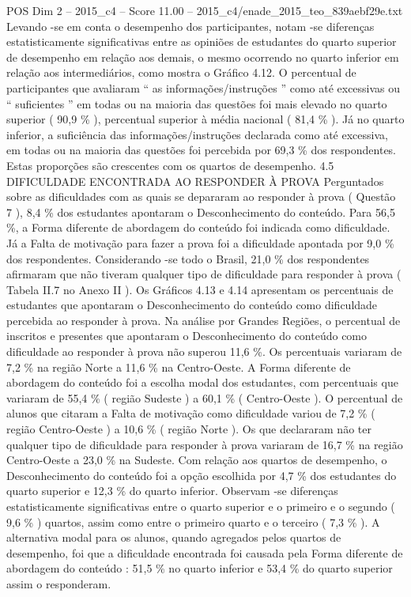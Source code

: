 \begin{textsample}{POS Dim 2 – 2015\_c4 – Score 11.00 – 2015\_c4/enade\_2015\_teo\_839aebf29e.txt}
Levando -se em conta o desempenho dos participantes, notam -se diferenças estatisticamente significativas entre as opiniões de estudantes do quarto superior de desempenho em relação aos demais, o mesmo ocorrendo no quarto inferior em relação aos intermediários, como mostra o Gráfico 4.12.
O percentual de participantes que avaliaram “ as informações/instruções ” como até excessivas ou “ suficientes ” em todas ou na maioria das questões foi mais elevado no quarto superior ( 90,9 \% ), percentual superior à média nacional ( 81,4 \% ).
Já no quarto inferior, a suficiência das informações/instruções declarada como até excessiva, em todas ou na maioria das questões foi percebida por 69,3 \% dos respondentes.
Estas proporções são crescentes com os quartos de desempenho. 4.5 DIFICULDADE ENCONTRADA AO RESPONDER À PROVA Perguntados sobre as dificuldades com as quais se depararam ao responder à prova ( Questão 7 ), 8,4 \% dos estudantes apontaram o Desconhecimento do conteúdo.
Para 56,5 \%, a Forma diferente de abordagem do conteúdo foi indicada como dificuldade.
Já a Falta de motivação para fazer a prova foi a dificuldade apontada por 9,0 \% dos respondentes.
Considerando -se todo o Brasil, 21,0 \% dos respondentes afirmaram que não tiveram qualquer tipo de dificuldade para responder à prova ( Tabela II.7 no Anexo II ).
Os Gráficos 4.13 e 4.14 apresentam os percentuais de estudantes que apontaram o Desconhecimento do conteúdo como dificuldade percebida ao responder à prova.
Na análise por Grandes Regiões, o percentual de inscritos e presentes que apontaram o Desconhecimento do conteúdo como dificuldade ao responder à prova não superou 11,6 \%.
Os percentuais variaram de 7,2 \% na região Norte a 11,6 \% na Centro-Oeste.
A Forma diferente de abordagem do conteúdo foi a escolha modal dos estudantes, com percentuais que variaram de 55,4 \% ( região Sudeste ) a 60,1 \% ( Centro-Oeste ).
O percentual de alunos que citaram a Falta de motivação como dificuldade variou de 7,2 \% ( região Centro-Oeste ) a 10,6 \% ( região Norte ).
Os que declararam não ter qualquer tipo de dificuldade para responder à prova variaram de 16,7 \% na região Centro-Oeste a 23,0 \% na Sudeste.
Com relação aos quartos de desempenho, o Desconhecimento do conteúdo foi a opção escolhida por 4,7 \% dos estudantes do quarto superior e 12,3 \% do quarto inferior.
Observam -se diferenças estatisticamente significativas entre o quarto superior e o primeiro e o segundo ( 9,6 \% ) quartos, assim como entre o primeiro quarto e o terceiro ( 7,3 \% ).
A alternativa modal para os alunos, quando agregados pelos quartos de desempenho, foi que a dificuldade encontrada foi causada pela Forma diferente de abordagem do conteúdo : 51,5 \% no quarto inferior e 53,4 \% do quarto superior assim o responderam.

\end{textsample}
